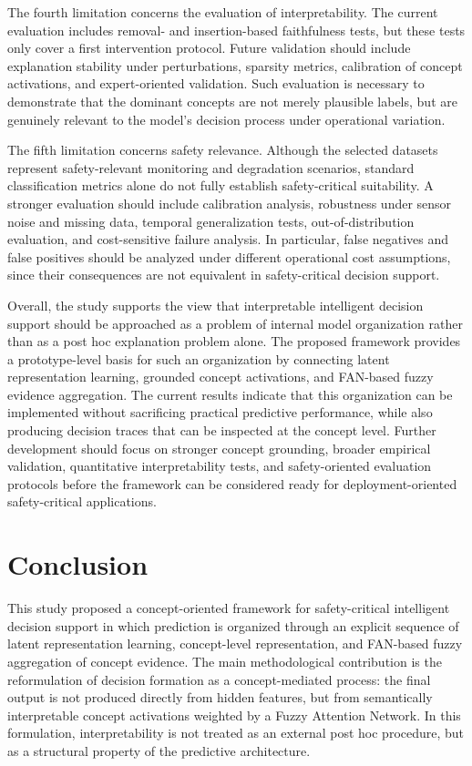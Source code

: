\documentclass[runningheads]{llncs}
\begin{document}
The fourth limitation concerns the evaluation of interpretability. The current evaluation includes removal- and insertion-based faithfulness tests, but these tests only cover a first intervention protocol. Future validation should include explanation stability under perturbations, sparsity metrics, calibration of concept activations, and expert-oriented validation. Such evaluation is necessary to demonstrate that the dominant concepts are not merely plausible labels, but are genuinely relevant to the model's decision process under operational variation.

The fifth limitation concerns safety relevance. Although the selected datasets represent safety-relevant monitoring and degradation scenarios, standard classification metrics alone do not fully establish safety-critical suitability. A stronger evaluation should include calibration analysis, robustness under sensor noise and missing data, temporal generalization tests, out-of-distribution evaluation, and cost-sensitive failure analysis. In particular, false negatives and false positives should be analyzed under different operational cost assumptions, since their consequences are not equivalent in safety-critical decision support.

Overall, the study supports the view that interpretable intelligent decision support should be approached as a problem of internal model organization rather than as a post hoc explanation problem alone. The proposed framework provides a prototype-level basis for such an organization by connecting latent representation learning, grounded concept activations, and FAN-based fuzzy evidence aggregation. The current results indicate that this organization can be implemented without sacrificing practical predictive performance, while also producing decision traces that can be inspected at the concept level. Further development should focus on stronger concept grounding, broader empirical validation, quantitative interpretability tests, and safety-oriented evaluation protocols before the framework can be considered ready for deployment-oriented safety-critical applications.

\section{Conclusion}

This study proposed a concept-oriented framework for safety-critical intelligent decision support in which prediction is organized through an explicit sequence of latent representation learning, concept-level representation, and FAN-based fuzzy aggregation of concept evidence. The main methodological contribution is the reformulation of decision formation as a concept-mediated process: the final output is not produced directly from hidden features, but from semantically interpretable concept activations weighted by a Fuzzy Attention Network. In this formulation, interpretability is not treated as an external post hoc procedure, but as a structural property of the predictive architecture.
\end{document}
